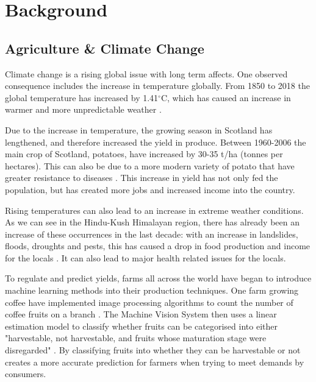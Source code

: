 \chapter{Background}


\section{Agriculture \& Climate Change}

Climate change is a rising global issue with long term affects. One observed consequence includes the increase in temperature globally. From 1850 to 2018 the global temperature has increased by 1.41$^ \circ $C, which has caused an increase in warmer and more unpredictable weather \cite{agriculturalAdaptationAnderson}.

Due to the increase in temperature, the growing season in Scotland has lengthened, and therefore increased the yield in produce. Between 1960-2006 the main crop of Scotland, potatoes, have increased by 30-35 t/ha (tonnes per hectares). This can also be due to a more modern variety of potato that have greater resistance to diseases \cite{ScotlandGregory}. This increase in yield has not only fed the population, but has created more jobs and increased income into the country.

Rising temperatures can also lead to an increase in extreme weather conditions. As we can see in the Hindu-Kush Himalayan region, there has already been an increase of these occurrences in the last decade: with an increase in landslides, floods, droughts and pests, this has caused a drop in food production and income for the locals \cite{HinduKushHussain}. It can also lead to major health related issues for the locals.

To regulate and predict yields, farms all across the world have began to introduce machine learning methods into their production techniques. One farm growing coffee have implemented image processing algorithms to count the number of coffee fruits on a branch \cite{coffeeCountRamos}. The Machine Vision System then uses a linear estimation model to classify whether fruits can be categorised into either "harvestable, not harvestable, and fruits whose maturation stage were disregarded" \cite{coffeeCountRamos}. By classifying fruits into whether they can be harvestable or not creates a more accurate prediction for farmers when trying to meet demands by consumers.

